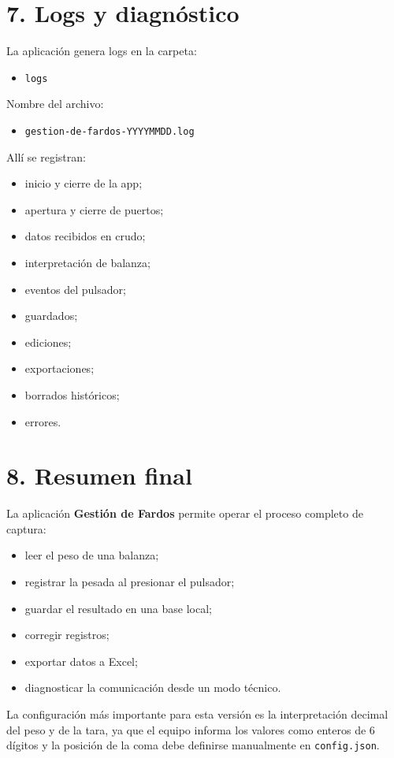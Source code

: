 \documentclass[12pt,a4paper]{article}
\begin{document}
\section*{7. Logs y diagn\'ostico}

La aplicaci\'on genera logs en la carpeta:

\begin{itemize}
\item \texttt{logs}
\end{itemize}

Nombre del archivo:

\begin{itemize}
\item \texttt{gestion-de-fardos-YYYYMMDD.log}
\end{itemize}

All\'i se registran:

\begin{itemize}
\item inicio y cierre de la app;
\item apertura y cierre de puertos;
\item datos recibidos en crudo;
\item interpretaci\'on de balanza;
\item eventos del pulsador;
\item guardados;
\item ediciones;
\item exportaciones;
\item borrados hist\'oricos;
\item errores.
\end{itemize}

\section*{8. Resumen final}

La aplicaci\'on \textbf{Gesti\'on de Fardos} permite operar el proceso completo de captura:

\begin{itemize}
\item leer el peso de una balanza;
\item registrar la pesada al presionar el pulsador;
\item guardar el resultado en una base local;
\item corregir registros;
\item exportar datos a Excel;
\item diagnosticar la comunicaci\'on desde un modo t\'ecnico.
\end{itemize}

La configuraci\'on m\'as importante para esta versi\'on es la interpretaci\'on decimal del peso y de la tara, ya que el equipo informa los valores como enteros de 6 d\'igitos y la posici\'on de la coma debe definirse manualmente en \texttt{config.json}.
\end{document}

